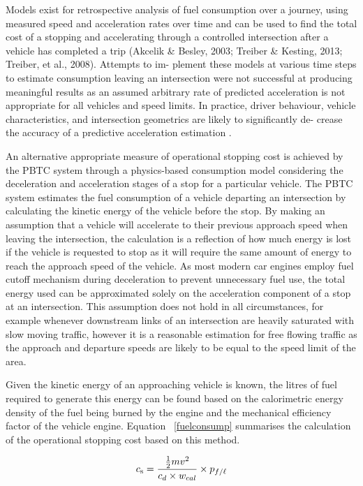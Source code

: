 Models exist for retrospective analysis of fuel consumption over a journey, using measured speed and acceleration rates over time and can be used to find the total cost of a stopping and accelerating through a controlled intersection after a vehicle has completed a trip (Akcelik & Besley, 2003; Treiber & Kesting, 2013; Treiber, et al., 2008). Attempts to im- plement these models at various time steps to estimate consumption leaving an intersection were not successful at producing meaningful results as an assumed arbitrary rate of predicted acceleration is not appropriate for all vehicles and speed limits. In practice, driver behaviour, vehicle characteristics, and intersection geometrics are likely to significantly de- crease the accuracy of a predictive acceleration estimation \cite{kesting2013traffic}.

An alternative appropriate measure of operational stopping cost is achieved by the PBTC system through a physics-based consumption model considering the deceleration and acceleration stages of a stop for a particular vehicle. The PBTC system estimates the fuel consumption of a vehicle departing an intersection by calculating the kinetic energy of the vehicle before the stop. By making an assumption that a vehicle will accelerate to their previous approach speed when leaving the intersection, the calculation is a reflection of how much energy is lost if the vehicle is requested to stop as it will require the same amount of energy to reach the approach speed of the vehicle. As most modern car engines employ fuel cutoff mechanism during deceleration to prevent unnecessary fuel use, the total energy used can be approximated solely on the acceleration component of a stop at an intersection. This assumption does not hold in all circumstances, for example whenever downstream links of an intersection are heavily saturated with slow moving traffic, however it is a reasonable estimation for free flowing traffic as the approach and departure speeds are likely to be equal to the speed limit of the area. 

Given the kinetic energy of an approaching vehicle is known, the litres of fuel required to generate this energy can be found based on the calorimetric energy density of the fuel being burned by the engine and the mechanical efficiency factor of the vehicle engine. Equation ~\ref{fuelconsump} summarises the calculation of the operational stopping cost based on this method.

\begin{align}
	\centering
		c_\text{s} = {\frac{\frac{1}{2}m{v}^{2} }{c_d \times w_{cal}}} \times {p_{f\text{/}\ell}}
	\label{fuelconsump}
\end{align}

